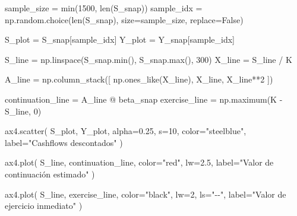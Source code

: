 \documentclass[
  11pt,
]{article}
\newenvironment{Shaded}{}{}
\newcommand{\BuiltInTok}[1]{\textcolor[rgb]{0.00,0.50,0.00}{#1}}
\newcommand{\DecValTok}[1]{\textcolor[rgb]{0.25,0.63,0.44}{#1}}
\newcommand{\FloatTok}[1]{\textcolor[rgb]{0.25,0.63,0.44}{#1}}
\newcommand{\NormalTok}[1]{#1}
\newcommand{\OperatorTok}[1]{\textcolor[rgb]{0.40,0.40,0.40}{#1}}
\newcommand{\StringTok}[1]{\textcolor[rgb]{0.25,0.44,0.63}{#1}}
\newcommand{\VariableTok}[1]{\textcolor[rgb]{0.10,0.09,0.49}{#1}}
\begin{document}
\begin{Shaded}
\begin{Highlighting}[]
\NormalTok{    sample\_size }\OperatorTok{=} \BuiltInTok{min}\NormalTok{(}\DecValTok{1500}\NormalTok{, }\BuiltInTok{len}\NormalTok{(S\_snap))}
\NormalTok{    sample\_idx }\OperatorTok{=}\NormalTok{ np.random.choice(}\BuiltInTok{len}\NormalTok{(S\_snap), size}\OperatorTok{=}\NormalTok{sample\_size, replace}\OperatorTok{=}\VariableTok{False}\NormalTok{)}

\NormalTok{    S\_plot }\OperatorTok{=}\NormalTok{ S\_snap[sample\_idx]}
\NormalTok{    Y\_plot }\OperatorTok{=}\NormalTok{ Y\_snap[sample\_idx]}

\NormalTok{    S\_line }\OperatorTok{=}\NormalTok{ np.linspace(S\_snap.}\BuiltInTok{min}\NormalTok{(), S\_snap.}\BuiltInTok{max}\NormalTok{(), }\DecValTok{300}\NormalTok{)}
\NormalTok{    X\_line }\OperatorTok{=}\NormalTok{ S\_line }\OperatorTok{/}\NormalTok{ K}

\NormalTok{    A\_line }\OperatorTok{=}\NormalTok{ np.column\_stack([}
\NormalTok{        np.ones\_like(X\_line),}
\NormalTok{        X\_line,}
\NormalTok{        X\_line}\OperatorTok{**}\DecValTok{2}
\NormalTok{    ])}

\NormalTok{    continuation\_line }\OperatorTok{=}\NormalTok{ A\_line }\OperatorTok{@}\NormalTok{ beta\_snap}
\NormalTok{    exercise\_line }\OperatorTok{=}\NormalTok{ np.maximum(K }\OperatorTok{{-}}\NormalTok{ S\_line, }\DecValTok{0}\NormalTok{)}

\NormalTok{    ax4.scatter(}
\NormalTok{        S\_plot,}
\NormalTok{        Y\_plot,}
\NormalTok{        alpha}\OperatorTok{=}\FloatTok{0.25}\NormalTok{,}
\NormalTok{        s}\OperatorTok{=}\DecValTok{10}\NormalTok{,}
\NormalTok{        color}\OperatorTok{=}\StringTok{"steelblue"}\NormalTok{,}
\NormalTok{        label}\OperatorTok{=}\StringTok{"Cashflows descontados"}
\NormalTok{    )}

\NormalTok{    ax4.plot(}
\NormalTok{        S\_line,}
\NormalTok{        continuation\_line,}
\NormalTok{        color}\OperatorTok{=}\StringTok{"red"}\NormalTok{,}
\NormalTok{        lw}\OperatorTok{=}\FloatTok{2.5}\NormalTok{,}
\NormalTok{        label}\OperatorTok{=}\StringTok{"Valor de continuación estimado"}
\NormalTok{    )}

\NormalTok{    ax4.plot(}
\NormalTok{        S\_line,}
\NormalTok{        exercise\_line,}
\NormalTok{        color}\OperatorTok{=}\StringTok{"black"}\NormalTok{,}
\NormalTok{        lw}\OperatorTok{=}\DecValTok{2}\NormalTok{,}
\NormalTok{        ls}\OperatorTok{=}\StringTok{"{-}{-}"}\NormalTok{,}
\NormalTok{        label}\OperatorTok{=}\StringTok{"Valor de ejercicio inmediato"}
\NormalTok{    )}


\end{Highlighting}
\end{Shaded}
\end{document}

